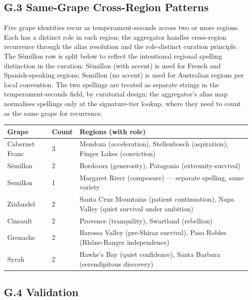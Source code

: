 \documentclass[11pt]{article}
\begin{document}
\subsection*{G.3 Same-Grape Cross-Region Patterns}

Five grape identities recur as temperament-seconds across two or more regions. Each has a distinct role in each region; the aggregator handles cross-region recurrence through the alias resolution and the role-distinct curation principle. The S\'emillon row is split below to reflect the intentional regional spelling distinction in the curation: S\'emillon (with accent) is used for French and Spanish-speaking regions; Semillon (no accent) is used for Australian regions per local convention. The two spellings are treated as separate strings in the temperament-seconds field, by curatorial design; the aggregator's alias map normalises spellings only at the signature-tier lookup, where they need to count as the same grape for recurrence.

\begin{small}
\begin{longtable}{p{3cm} p{1cm} p{8cm}}
\toprule
\textbf{Grape} & \textbf{Count} & \textbf{Regions (with role)} \\
\midrule
\endhead
Cabernet Franc      & 3 & Mendoza (acceleration), Stellenbosch (aspiration), Finger Lakes (conviction) \\
S\'emillon          & 2 & Bordeaux (generosity), Patagonia (extremity-survival) \\
Semillon            & 1 & Margaret River (composure) --- separate spelling, same variety \\
Zinfandel           & 2 & Santa Cruz Mountains (patient continuation), Napa Valley (quiet survival under ambition) \\
Cinsault            & 2 & Provence (tranquility), Swartland (rebellion) \\
Grenache            & 2 & Barossa Valley (pre-Shiraz survival), Paso Robles (Rh\^one-Ranger independence) \\
Syrah               & 2 & Hawke's Bay (quiet confidence), Santa Barbara (serendipitous discovery) \\
\bottomrule
\end{longtable}
\end{small}

\subsection*{G.4 Validation}
\end{document}
